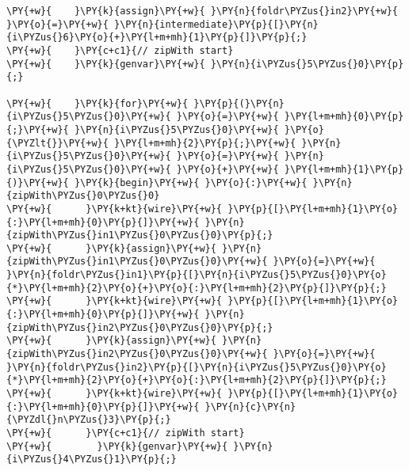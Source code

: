 {\begin{Verbatim}[commandchars=\\\{\}]
\PY{+w}{    }\PY{k}{assign}\PY{+w}{ }\PY{n}{foldr\PYZus{}in2}\PY{+w}{ }\PY{o}{=}\PY{+w}{ }\PY{n}{intermediate}\PY{p}{[}\PY{n}{i\PYZus{}6}\PY{o}{+}\PY{l+m+mh}{1}\PY{p}{]}\PY{p}{;}
\PY{+w}{    }\PY{c+c1}{// zipWith start}
\PY{+w}{    }\PY{k}{genvar}\PY{+w}{ }\PY{n}{i\PYZus{}5\PYZus{}0}\PY{p}{;}

\PY{+w}{    }\PY{k}{for}\PY{+w}{ }\PY{p}{(}\PY{n}{i\PYZus{}5\PYZus{}0}\PY{+w}{ }\PY{o}{=}\PY{+w}{ }\PY{l+m+mh}{0}\PY{p}{;}\PY{+w}{ }\PY{n}{i\PYZus{}5\PYZus{}0}\PY{+w}{ }\PY{o}{\PYZlt{}}\PY{+w}{ }\PY{l+m+mh}{2}\PY{p}{;}\PY{+w}{ }\PY{n}{i\PYZus{}5\PYZus{}0}\PY{+w}{ }\PY{o}{=}\PY{+w}{ }\PY{n}{i\PYZus{}5\PYZus{}0}\PY{+w}{ }\PY{o}{+}\PY{+w}{ }\PY{l+m+mh}{1}\PY{p}{)}\PY{+w}{ }\PY{k}{begin}\PY{+w}{ }\PY{o}{:}\PY{+w}{ }\PY{n}{zipWith\PYZus{}0\PYZus{}0}
\PY{+w}{      }\PY{k+kt}{wire}\PY{+w}{ }\PY{p}{[}\PY{l+m+mh}{1}\PY{o}{:}\PY{l+m+mh}{0}\PY{p}{]}\PY{+w}{ }\PY{n}{zipWith\PYZus{}in1\PYZus{}0\PYZus{}0}\PY{p}{;}
\PY{+w}{      }\PY{k}{assign}\PY{+w}{ }\PY{n}{zipWith\PYZus{}in1\PYZus{}0\PYZus{}0}\PY{+w}{ }\PY{o}{=}\PY{+w}{ }\PY{n}{foldr\PYZus{}in1}\PY{p}{[}\PY{n}{i\PYZus{}5\PYZus{}0}\PY{o}{*}\PY{l+m+mh}{2}\PY{o}{+}\PY{o}{:}\PY{l+m+mh}{2}\PY{p}{]}\PY{p}{;}
\PY{+w}{      }\PY{k+kt}{wire}\PY{+w}{ }\PY{p}{[}\PY{l+m+mh}{1}\PY{o}{:}\PY{l+m+mh}{0}\PY{p}{]}\PY{+w}{ }\PY{n}{zipWith\PYZus{}in2\PYZus{}0\PYZus{}0}\PY{p}{;}
\PY{+w}{      }\PY{k}{assign}\PY{+w}{ }\PY{n}{zipWith\PYZus{}in2\PYZus{}0\PYZus{}0}\PY{+w}{ }\PY{o}{=}\PY{+w}{ }\PY{n}{foldr\PYZus{}in2}\PY{p}{[}\PY{n}{i\PYZus{}5\PYZus{}0}\PY{o}{*}\PY{l+m+mh}{2}\PY{o}{+}\PY{o}{:}\PY{l+m+mh}{2}\PY{p}{]}\PY{p}{;}
\PY{+w}{      }\PY{k+kt}{wire}\PY{+w}{ }\PY{p}{[}\PY{l+m+mh}{1}\PY{o}{:}\PY{l+m+mh}{0}\PY{p}{]}\PY{+w}{ }\PY{n}{c}\PY{n}{\PYZdl{}n\PYZus{}3}\PY{p}{;}
\PY{+w}{      }\PY{c+c1}{// zipWith start}
\PY{+w}{        }\PY{k}{genvar}\PY{+w}{ }\PY{n}{i\PYZus{}4\PYZus{}1}\PY{p}{;}


\end{Verbatim}}
